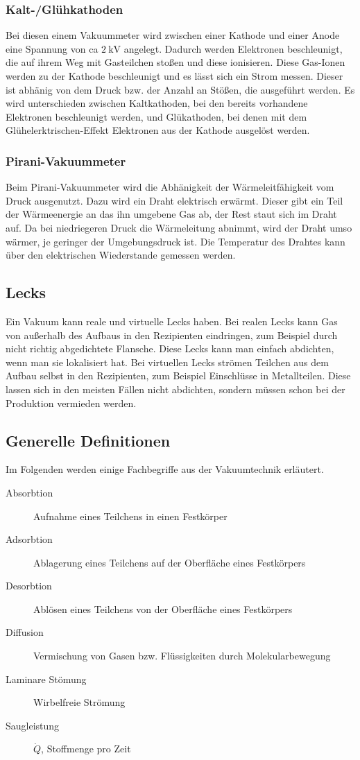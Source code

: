 \subsubsection{Kalt-/Glühkathoden}
Bei diesen einem Vakuummeter wird zwischen einer Kathode und einer Anode eine Spannung von ca $\SI{2}{\kilo \volt}$ angelegt. Dadurch werden Elektronen
beschleunigt, die auf ihrem Weg mit Gasteilchen stoßen und diese ionisieren. Diese Gas-Ionen werden zu der Kathode beschleunigt und es lässt sich ein
Strom messen. Dieser ist abhänig von dem Druck bzw. der Anzahl an Stößen, die ausgeführt werden. Es wird unterschieden zwischen Kaltkathoden, bei den bereits
vorhandene Elektronen beschleunigt werden, und Glükathoden, bei denen mit dem Glühelerktrischen-Effekt Elektronen aus der Kathode ausgelöst werden.
\subsubsection{Pirani-Vakuummeter}
Beim Pirani-Vakuummeter wird die Abhänigkeit der Wärmeleitfähigkeit vom Druck ausgenutzt. Dazu wird ein Draht elektrisch erwärmt. Dieser gibt ein Teil der
Wärmeenergie an das ihn umgebene Gas ab, der Rest staut sich im Draht auf. Da bei niedriegeren Druck die Wärmeleitung abnimmt, wird der Draht umso wärmer, je
geringer der Umgebungsdruck ist. Die Temperatur des Drahtes kann über den elektrischen Wiederstande gemessen werden.
\subsection{Lecks}
Ein Vakuum kann reale und virtuelle Lecks haben. Bei realen Lecks kann Gas von außerhalb des Aufbaus in den Rezipienten eindringen, zum Beispiel durch
nicht richtig abgedichtete Flansche. Diese Lecks kann man einfach abdichten, wenn man sie lokalisiert hat. Bei virtuellen Lecks strömen Teilchen aus dem
Aufbau selbst in den Rezipienten, zum Beispiel Einschlüsse in Metallteilen. Diese lassen sich in den meisten Fällen nicht abdichten, sondern müssen schon
bei der Produktion vermieden werden.
\subsection{Generelle Definitionen}
Im Folgenden werden einige Fachbegriffe aus der Vakuumtechnik erläutert.
\begin{description}
	\item[Absorbtion] Aufnahme eines Teilchens in einen Festkörper
	\item[Adsorbtion] Ablagerung eines Teilchens auf der Oberfläche eines Festkörpers
	\item[Desorbtion] Ablösen eines Teilchens von der Oberfläche eines Festkörpers
	\item[Diffusion] Vermischung von Gasen bzw. Flüssigkeiten durch Molekularbewegung
	\item[Laminare Stömung] Wirbelfreie Strömung
	\item[Saugleistung] $\dot{Q}$, Stoffmenge pro Zeit
\end{description}
